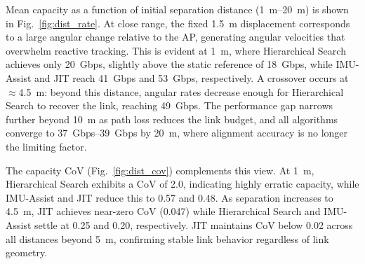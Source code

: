 \documentclass[fleqn,10pt]{wlscirep}
\begin{document}
Mean capacity as a function of initial separation distance (\SIrange{1}{20}{m}) is shown in Fig.~\ref{fig:dist_rate}. At close range, the fixed \SI{1.5}{m} displacement corresponds to a large angular change relative to the AP, generating angular velocities that overwhelm reactive tracking. This is evident at \SI{1}{m}, where Hierarchical Search achieves only \SI{20}{Gbps}, slightly above the static reference of \SI{18}{Gbps}, while IMU-Assist and JIT reach \SI{41}{Gbps} and \SI{53}{Gbps}, respectively. A crossover occurs at $\approx$\SI{4.5}{m}: beyond this distance, angular rates decrease enough for Hierarchical Search to recover the link, reaching \SI{49}{Gbps}. The performance gap narrows further beyond \SI{10}{m} as path loss reduces the link budget, and all algorithms converge to \SIrange{37}{39}{Gbps} by \SI{20}{m}, where alignment accuracy is no longer the limiting factor.

The capacity CoV (Fig.~\ref{fig:dist_cov}) complements this view. At \SI{1}{m}, Hierarchical Search exhibits a CoV of 2.0, indicating highly erratic capacity, while IMU-Assist and JIT reduce this to 0.57 and 0.48. As separation increases to \SI{4.5}{m}, JIT achieves near-zero CoV (0.047) while Hierarchical Search and IMU-Assist settle at 0.25 and 0.20, respectively. JIT maintains CoV below 0.02 across all distances beyond \SI{5}{m}, confirming stable link behavior regardless of link geometry.
\end{document}
